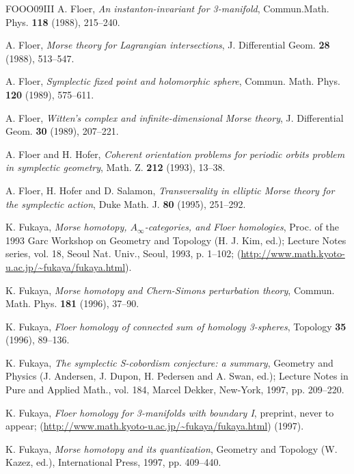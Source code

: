 \begin{thebibliography}{FOOO09III}
 A. Floer, \emph{An instanton-invariant for 3-manifold}, Commun.Math. Phys. \textbf{118} (1988), 215–240.

 A. Floer, \emph{Morse theory for Lagrangian intersections}, J. Differential Geom. \textbf{28} (1988), 513–547.

 A. Floer, \emph{Symplectic fixed point and holomorphic sphere}, Commun. Math. Phys. \textbf{120} (1989), 575–611.

 A. Floer, \emph{Witten's complex and infinite-dimensional Morse theory}, J. Differential Geom. \textbf{30} (1989), 207–221.

 A. Floer and H. Hofer, \emph{Coherent orientation problems for periodic orbits problem in symplectic geometry}, Math. Z. \textbf{212} (1993), 13–38.

 A. Floer, H. Hofer and D. Salamon, \emph{Transversality in elliptic Morse theory for the symplectic action}, Duke Math. J. \textbf{80} (1995), 251–292.

 K. Fukaya, \emph{Morse homotopy, \(A_\infty\)-categories, and Floer homologies}, Proc. of the 1993 Garc Workshop on Geometry and Topology (H. J. Kim, ed.); Lecture Notes series, vol. 18, Seoul Nat. Univ., Seoul, 1993, p. 1–102; (\url{http://www.math.kyoto-u.ac.jp/~fukaya/fukaya.html}).

 K. Fukaya, \emph{Morse homotopy and Chern-Simons perturbation theory}, Commun. Math. Phys. \textbf{181} (1996), 37–90.

 K. Fukaya, \emph{Floer homology of connected sum of homology 3-spheres}, Topology \textbf{35} (1996), 89–136.

 K. Fukaya, \emph{The symplectic S-cobordism conjecture: a summary}, Geometry and Physics (J. Andersen, J. Dupon, H. Pedersen and A. Swan, ed.); Lecture Notes in Pure and Applied Math., vol. 184, Marcel Dekker, New-York, 1997, pp. 209–220.

 K. Fukaya, \emph{Floer homology for 3-manifolds with boundary I}, preprint, never to appear; (\url{http://www.math.kyoto-u.ac.jp/~fukaya/fukaya.html}) (1997).

 K. Fukaya, \emph{Morse homotopy and its quantization}, Geometry and Topology (W. Kazez, ed.), International Press, 1997, pp. 409–440.


\end{thebibliography}
